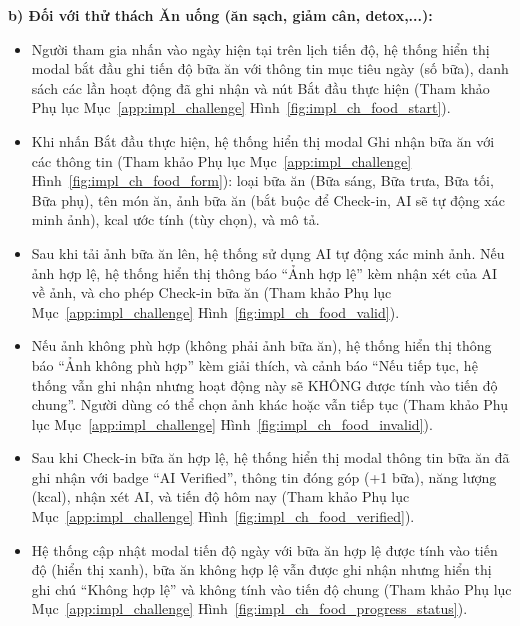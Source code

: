 \textbf{b) Đối với thử thách Ăn uống (ăn sạch, giảm cân, detox,...):}
\begin{itemize}
    \item Người tham gia nhấn vào ngày hiện tại trên lịch tiến độ, hệ thống hiển thị modal bắt đầu ghi tiến độ bữa ăn với thông tin mục tiêu ngày (số bữa), danh sách các lần hoạt động đã ghi nhận và nút Bắt đầu thực hiện (Tham khảo Phụ lục Mục~\ref{app:impl_challenge} Hình~\ref{fig:impl_ch_food_start}).


    \item Khi nhấn Bắt đầu thực hiện, hệ thống hiển thị modal Ghi nhận bữa ăn với các thông tin (Tham khảo Phụ lục Mục~\ref{app:impl_challenge} Hình~\ref{fig:impl_ch_food_form}): loại bữa ăn (Bữa sáng, Bữa trưa, Bữa tối, Bữa phụ), tên món ăn, ảnh bữa ăn (bắt buộc để Check-in, AI sẽ tự động xác minh ảnh), kcal ước tính (tùy chọn), và mô tả.


    \item Sau khi tải ảnh bữa ăn lên, hệ thống sử dụng AI tự động xác minh ảnh. Nếu ảnh hợp lệ, hệ thống hiển thị thông báo ``Ảnh hợp lệ'' kèm nhận xét của AI về ảnh, và cho phép Check-in bữa ăn (Tham khảo Phụ lục Mục~\ref{app:impl_challenge} Hình~\ref{fig:impl_ch_food_valid}).


    \item Nếu ảnh không phù hợp (không phải ảnh bữa ăn), hệ thống hiển thị thông báo ``Ảnh không phù hợp'' kèm giải thích, và cảnh báo ``Nếu tiếp tục, hệ thống vẫn ghi nhận nhưng hoạt động này sẽ KHÔNG được tính vào tiến độ chung''. Người dùng có thể chọn ảnh khác hoặc vẫn tiếp tục (Tham khảo Phụ lục Mục~\ref{app:impl_challenge} Hình~\ref{fig:impl_ch_food_invalid}).


    \item Sau khi Check-in bữa ăn hợp lệ, hệ thống hiển thị modal thông tin bữa ăn đã ghi nhận với badge ``AI Verified'', thông tin đóng góp (+1 bữa), năng lượng (kcal), nhận xét AI, và tiến độ hôm nay (Tham khảo Phụ lục Mục~\ref{app:impl_challenge} Hình~\ref{fig:impl_ch_food_verified}).


    \item Hệ thống cập nhật modal tiến độ ngày với bữa ăn hợp lệ được tính vào tiến độ (hiển thị xanh), bữa ăn không hợp lệ vẫn được ghi nhận nhưng hiển thị ghi chú ``Không hợp lệ'' và không tính vào tiến độ chung (Tham khảo Phụ lục Mục~\ref{app:impl_challenge} Hình~\ref{fig:impl_ch_food_progress_status}).

\end{itemize}

